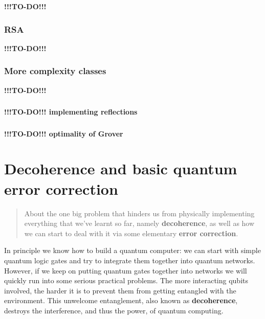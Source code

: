 \documentclass[fleqn]{article}
\let\oldsection\section
\renewcommand\section{\clearpage\oldsection}
\begin{document}
\textbf{!!!TO-DO!!!}

\hypertarget{rsa}{%
\subsubsection{RSA}\label{rsa}}

\textbf{!!!TO-DO!!!}

\hypertarget{more-complexity-classes}{%
\subsubsection{More complexity classes}\label{more-complexity-classes}}

\textbf{!!!TO-DO!!!}

\hypertarget{section}{%
\subsubsection{}\label{section}}

\textbf{!!!TO-DO!!! implementing reflections}

\hypertarget{section-1}{%
\subsubsection{}\label{section-1}}

\textbf{!!!TO-DO!!! optimality of Grover}

\hypertarget{decoherence-and-basic-quantum-error-correction}{%
\section{Decoherence and basic quantum error correction}\label{decoherence-and-basic-quantum-error-correction}}

\begin{quote}
About the one big problem that hinders us from physically implementing everything that we've learnt so far, namely \textbf{decoherence}, as well as how we can start to deal with it via some elementary \textbf{error correction}.
\end{quote}

In principle we know how to build a quantum computer: we can start with simple quantum logic gates and try to integrate them together into quantum networks.
However, if we keep on putting quantum gates together into networks we will quickly run into some serious practical problems.
The more interacting qubits involved, the harder it is to prevent them from getting entangled with the environment.
This unwelcome entanglement, also known as \textbf{decoherence}, destroys the interference, and thus the power, of quantum computing.
\end{document}
